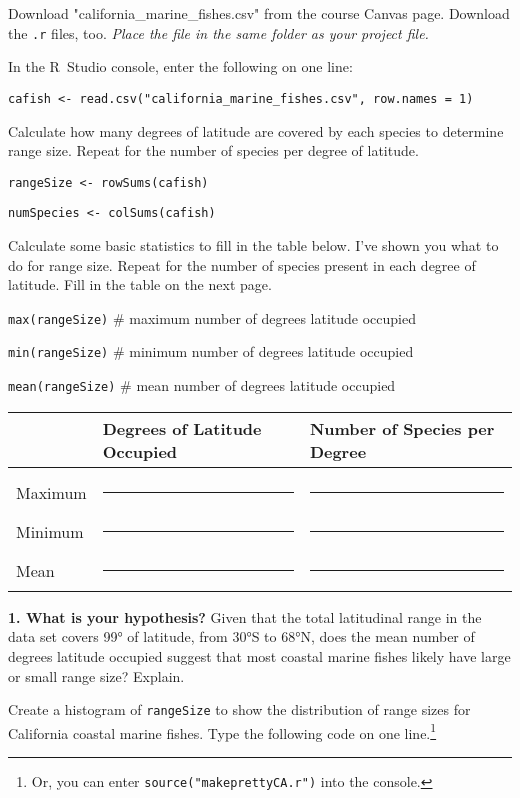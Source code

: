 \documentclass[11pt]{article}
\begin{document}
Download "california\_marine\_fishes.csv" from the course Canvas page. 
Download the \texttt{.r} files, too. \textit{Place the file in the same 
	folder as your project file.}

In the R~Studio console, enter the following on one line:

\texttt{cafish \textless{}-
read.csv("california\_marine\_fishes.csv", row.names = 1)}

Calculate how many degrees of latitude are covered by each
species to determine range size. Repeat for the number of species per
degree of latitude.

\texttt{rangeSize \textless{}- rowSums(cafish)}

\texttt{numSpecies \textless{}- colSums(cafish)}

Calculate some basic statistics to fill in the table below. I've shown
you what to do for range size. Repeat for the number of species present
in each degree of latitude. Fill in the table on the next page.

\texttt{max(rangeSize)} \qquad \# maximum number of degrees latitude occupied

\texttt{min(rangeSize)} \qquad \# minimum number of degrees latitude occupied

\texttt{mean(rangeSize)} \qquad \# mean number of degrees latitude occupied

\begin{tabular}[l]{@{}lL{1.6in}L{1.6in}@{}}
\toprule
& Degrees of Latitude Occupied & Number of Species per Degree\tabularnewline
\midrule
 & & \\[1ex]
Maximum & \rule{1.5in}{0.4pt} & \rule{1.5in}{0.4pt} \tabularnewline[2ex]
Minimum & \rule{1.5in}{0.4pt} & \rule{1.5in}{0.4pt} \tabularnewline[2ex]
Mean & \rule{1.5in}{0.4pt} & \rule{1.5in}{0.4pt} \tabularnewline
\bottomrule
\end{tabular}

\bigskip

\textbf{1. What is your hypothesis?} Given that the total latitudinal range in
the data set covers 99° of latitude, from 30°S to 68°N, does the mean
number of degrees latitude occupied suggest that most coastal marine
fishes likely have large or small range size? Explain.

\vspace{9\baselineskip}

Create a histogram of \texttt{rangeSize} to show the distribution of range sizes for California coastal marine fishes. Type the following code on one line.\footnote{Or, you can enter \texttt{source("makeprettyCA.r")} into the console.}
\end{document}
